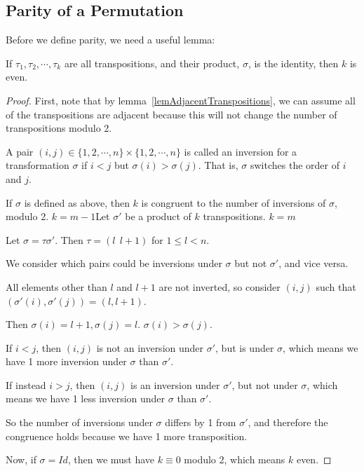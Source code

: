 \documentclass[../Main.tex]{subfiles}
\begin{document}
\subsection{Parity of a Permutation}
Before we define parity, we need a useful lemma:
\begin{lemma}
    If $\tau_1, \tau_2, \cdots, \tau_k$ are all transpositions, and their product, $\sigma$, is the identity, then $k$ is even.
    \label{lemEvenProductIdentity}
\end{lemma}
\begin{proof}
    First, note that by lemma~\ref{lemAdjacentTranspositions}, we can assume all of the transpositions are adjacent because this will not change the number of transpositions modulo 2.\par
    A pair $(i, j) \in \{1, 2, \cdots, n\} \times \{1, 2, \cdots, n\}$ is called an inversion for a transformation $\sigma$ if $i < j$ but $\sigma(i) > \sigma(j)$. That is, $\sigma$ switches the order of $i$ and $j$.
    \begin{subproof}{If $\sigma$ is defined as above, then $k$ is congruent to the number of inversions of $\sigma$, modulo 2.}
        {$k = m - 1$}{Let $\sigma'$ be a product of $k$ transpositions.}
        {$k = m$}{
            Let $\sigma = \tau \sigma'$. Then $\tau = (l~~l+1)$ for $1 \leq l < n$.\par
            We consider which pairs could be inversions under $\sigma$ but not $\sigma'$, and vice versa.\par
            All elements other than $l$ and $l + 1$ are not inverted, so consider $(i, j)$ such that $(\sigma'(i), \sigma'(j)) = (l, l+1)$.\par
            Then $\sigma(i) = l+1, \sigma(j) = l$. $\sigma(i) > \sigma(j)$.\par
            If $i < j$, then $(i, j)$ is not an inversion under $\sigma'$, but is under $\sigma$, which means we have 1 more inversion under $\sigma$ than $\sigma'$.\par
            If instead $i > j$, then $(i, j)$ is an inversion under $\sigma'$, but not under $\sigma$, which means we have 1 less inversion under $\sigma$ than $\sigma'$.\par
            So the number of inversions under $\sigma$ differs by 1 from $\sigma'$, and therefore the congruence holds because we have 1 more transposition.
        }
    \end{subproof}
    Now, if $\sigma = Id$, then we must have $k \equiv 0$ modulo 2, which means $k$ even.
\end{proof}
\end{document}
